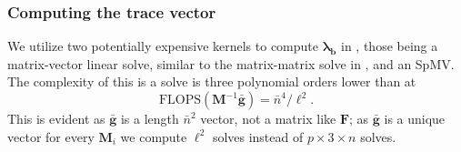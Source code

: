 
%		



%
%
%
\subsubsection{Computing the trace vector}

%
%
%
We utilize two potentially expensive kernels to compute $\symbf{\lambda}_{\textbf{b}}$ in , those being a matrix-vector linear solve, similar to the matrix-matrix solve in , and an SpMV. 
The complexity of this is a solve is three polynomial orders lower than  at
\begin{equation}
	\text{FLOPS}(\textbf{M}^{-1}\bar{\textbf{g}}) = \bar{n}^4/\ell^2.
\end{equation}
\noindent
This is evident as $\bar{\textbf{g}}$ is a length $\bar{n}^2$ vector, not a matrix like $\textbf{F}$; as $\bar{\textbf{g}}$ is a unique vector for every $\textbf{M}_i$ we compute $\ell^2$ solves instead of $p \times 3 \times n$ solves.

